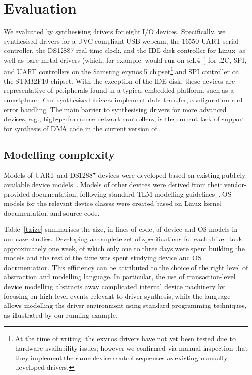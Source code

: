 \section{Evaluation}
\label{s:eval}
We evaluated \termite by synthesising drivers for eight I/O devices.  Specifically, we synthesised drivers for a UVC-compliant USB webcam, the 16550 UART serial controller, the DS12887 real-time clock, and the IDE disk controller for Linux, as well as bare metal drivers (which, for example, would run on seL4~\cite{Klein_EHACDEEKNSTW_09}) for I2C, SPI, and UART controllers on the Samsung exynos 5 chipset\footnote{At the time of writing, the exynos drivers have not yet been tested due to hardware availability issues; however we confirmed via manual inspection that they implement the same device control sequences as existing manually developed drivers.} and SPI controller on the STM32F10 chipset.  With the exception of the IDE disk, these devices are representative of peripherals found in a typical embedded platform, such as a smartphone.  Our synthesised drivers implement data transfer, configuration and error handling.  The main barrier to synthesising drivers for more advanced devices, e.g., high-performance network controllers, is the current lack of support for synthesis of DMA code in the current version of \termite.  

\subsection{Modelling complexity} 
Models of UART and DS12887 devices were developed based on existing publicly available device models~\cite{ds12887, uart}.  Models of other devices were derived from their vendor-provided documentation, following standard TLM modelling guidelines~\cite{dml_ug}.  OS models for the relevant device classes were created based on Linux kernel documentation and source code.  

Table~\ref{t:size} summarises the size, in lines of code, of device and OS models in our case studies.  Developing a complete set of specifications for each driver took approximately one week, of which only one to three days were spent building the models and the rest of the time was spent studying device and OS documentation.  This efficiency can be attributed to the choice of the right level of abstraction and modelling language.  In particular, the use of transaction-level device modelling abstracts away complicated internal device machinery by focusing on high-level events relevant to driver synthesis, while the \tsl language allows modelling the driver environment using standard programming techniques, as illustrated by our running example.

